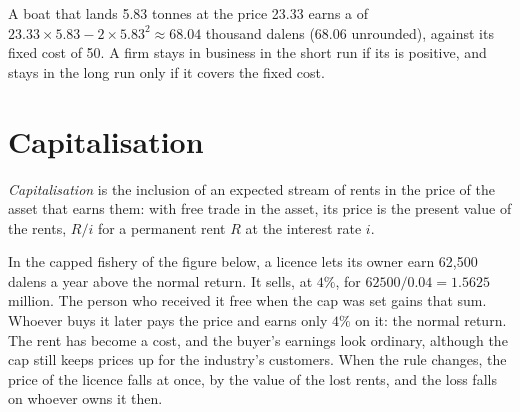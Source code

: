A boat that lands 5.83 tonnes at the price 23.33 earns a  of
$23.33 \times 5.83 - 2 \times 5.83^2 \approx 68.04$ thousand dalens (68.06 unrounded), against its fixed
cost of 50. A firm stays in business in the short run if its  is
positive, and stays in the long run only if it covers the fixed cost.

\section{Capitalisation}\label{sec:b1:competitive-industry:capitalisation}

\begin{definition}[Capitalisation]\label{def:b1:competitive-industry:capitalisation}
\emph{Capitalisation} is the inclusion of an expected stream of rents in
the price of the asset that earns them: with free trade in the asset, its
price is the present value of the rents, $R/i$ for a permanent rent $R$ at
the interest rate $i$.
\end{definition}

In the capped fishery of the figure below, a licence lets its owner earn
62,500 dalens a year above the normal return. It sells, at $4\%$, for $62500/0.04 = 1.5625$ million. The person who
received it free when the cap was set gains that sum. Whoever buys it later
pays the price and earns only $4\%$ on it: the normal return. The rent has
become a cost, and the buyer's earnings look ordinary, although the cap
still keeps prices up for the industry's customers. When the rule changes,
the price of the licence falls at once, by the value of the lost rents,
and the loss falls on whoever owns it then.

